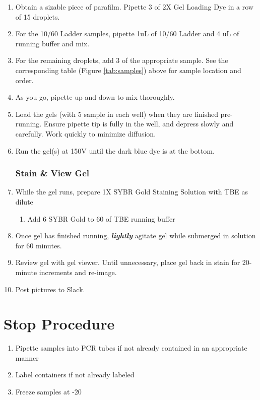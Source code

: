 \documentclass{ssiBio}
\begin{document}
\begin{enumerate}
\item{Obtain a sizable piece of parafilm. Pipette 3 \uL{} of 2X Gel Loading Dye in a row of 15 droplets.}
\item{For the 10/60 Ladder samples, pipette 1uL of 10/60 Ladder and 4 uL of running buffer and mix.}
\item{For the remaining droplets, add 3 \uL{} of the appropriate sample. See the corresponding table (Figure \ref{tab:samples}) above for sample location and order.}
\item{As you go, pipette up and down to mix thoroughly.}
\item{Load the gels (with 5 \uL{} sample in each well) when they are finished pre-running. Ensure pipette tip is fully in the well, and depress slowly and carefully. Work quickly to minimize diffusion.}
\item{Run the gel(s) at 150V until the dark blue dye is at the bottom.}

\subsubsection{Stain \& View Gel}
\item{While the gel runs, prepare 1X SYBR Gold Staining Solution with TBE as dilute}
	\begin{enumerate}
		\item{Add 6\uL{} SYBR Gold to 60\uL{} of TBE running buffer}
	\end{enumerate}
\item{Once gel has finished running, \textbf{\textit{lightly}} agitate gel while submerged in solution for 60 minutes.}
\item{Review gel with gel viewer. Until unnecessary, place gel back in stain for 20-minute increments and re-image.}
\item{Post pictures to Slack.}\\
\end{enumerate} 

\section*{Stop Procedure}
\begin{enumerate}
\item{Pipette samples into PCR tubes if not already contained in an appropriate manner}
\item{Label containers if not already labeled}
\item{Freeze samples at -20\C{}}
\end{enumerate}
\newpage
\end{document}
